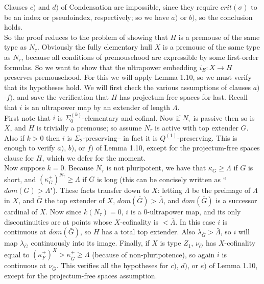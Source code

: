 \documentclass[12pt]{article}
\begin{document}
Clauses $c)$ and $d)$ of Condensation are impossible, since they require $crit(\sigma)$ to be an index or pseudoindex, respectively; so we have $a)$ or $b)$, so the conclusion holds.\\

So the proof reduces to the problem of showing that $H$ is a premouse of the same type as $N_\tau$.  Obviously the fully elementary hull $X$ is a premouse of the same type as $N_\tau$, because all conditions of premousehood are expressible by some first-order formulas.  So we want to show that the ultrapower embedding $i_E: X \longrightarrow H$ preserves premousehood.  For this we will apply Lemma 1.10, so we must verify that its hypotheses hold.  We will first check the various assumptions of clauses $a)$-$f)$, and save the verification that $H$ has projectum-free spaces for last.  Recall that $i$ is an ultrapower map by an extender of length $\Lambda$.\\

First note that $i$ is $\Sigma_0^{(k)}$-elementary and cofinal.  Now if $N_\tau$ is passive then so is $X$, and $H$ is trivially a premouse; so assume $N_\tau$ is active with top extender $G$.  Also if $k > 0$ then $i$ is $\Sigma_2$-preserving-- in fact it is $Q^{(1)}$-preserving.  This is enough to verify $a)$, $b)$, or $f)$ of Lemma 1.10, except for the projectum-free spaces clause for $H$, which we defer for the moment.\\


Now suppose $k = 0$.  Because $N_\tau$ is not pluripotent, we have that $\kappa_G \geq \Lambda$ if $G$ is short, and $( \kappa_G^+ )^{N_\tau} \geq \Lambda$ if $G$ is long (this can be concisely written as ``$dom(G) > \Lambda$").  These facts transfer down to $X$: letting $\bar{\Lambda}$ be the preimage of $\Lambda$ in $X$, and $\bar{G}$ the top extender of $X$, $dom (\bar{G} ) > \bar{\Lambda}$, and $dom (\bar{G})$ is a successor cardinal of $X$.  Now since $k(N_\tau ) = 0$, $i$ is a $0$-ultrapower map, and its only discontinuities are at points whose $X$-cofinality is $< \bar{\Lambda}$.  In this case $i$ is continuous at $dom (\bar{G})$, so $H$ has a total top extender.  Also $\lambda_{\bar{G}} > \bar{\Lambda}$, so $i$ will map $\lambda_{\bar{G}}$ continuously into its image.  Finally, if $X$ is type $Z_1$, $\nu_{\bar{G}}$ has $X$-cofinality equal to $(\kappa_F^+ )^X > \kappa_{\bar{G}}^+ \geq \bar{\Lambda}$ (because of non-pluripotence), so again $i$ is continuous at $\nu_{\bar{G}}$. This verifies all the hypotheses for $c)$, $d)$, or $e)$ of Lemma 1.10, except for the projectum-free spaces assumption.\\
\end{document}
